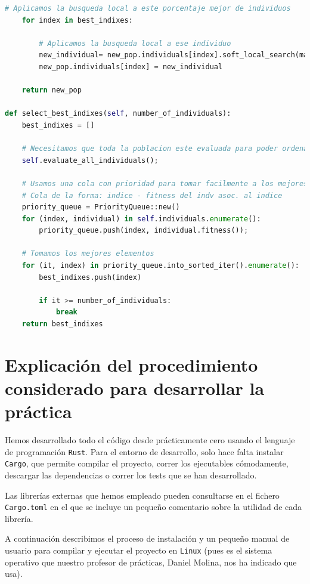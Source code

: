 \documentclass[11pt]{article}
\begin{document}
\begin{lstlisting}[language=Python, style=Boxed]
    # Aplicamos la busqueda local a este porcentaje mejor de individuos
    for index in best_indixes:

        # Aplicamos la busqueda local a ese individuo
        new_individual= new_pop.individuals[index].soft_local_search(max_fails)
        new_pop.individuals[index] = new_individual

    return new_pop

def select_best_indixes(self, number_of_individuals):
    best_indixes = []

    # Necesitamos que toda la poblacion este evaluada para poder ordenar a sus individuos
    self.evaluate_all_individuals();

    # Usamos una cola con prioridad para tomar facilmente a los mejores individuos
    # Cola de la forma: indice - fitness del indv asoc. al indice
    priority_queue = PriorityQueue::new()
    for (index, individual) in self.individuals.enumerate():
        priority_queue.push(index, individual.fitness());

    # Tomamos los mejores elementos
    for (it, index) in priority_queue.into_sorted_iter().enumerate():
        best_indixes.push(index)

        if it >= number_of_individuals:
            break
    return best_indixes
\end{lstlisting}

\pagebreak

\section{Explicación del procedimiento considerado para desarrollar la práctica}

Hemos desarrollado todo el código desde prácticamente cero usando el lenguaje de programación \lstinline{Rust}. Para el entorno de desarrollo, solo hace falta instalar \lstinline{Cargo}, que permite compilar el proyecto, correr los ejecutables cómodamente, descargar las dependencias o correr los tests que se han desarrollado.

Las librerías externas que hemos empleado pueden consultarse en el fichero \lstinline{Cargo.toml} en el que se incluye un pequeño comentario sobre la utilidad de cada librería.

A continuación describimos el proceso de instalación y un pequeño manual de usuario para compilar y ejecutar el proyecto en \lstinline{Linux} (pues es el sistema operativo que nuestro profesor de prácticas, Daniel Molina, nos ha indicado que usa).
\end{document}
